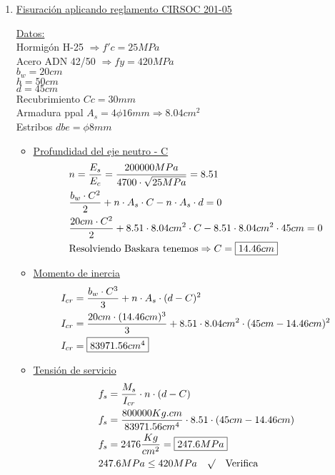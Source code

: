 \begin{enumerate}
\item \underline{Fisuración aplicando reglamento CIRSOC 201-05}

\underline{Datos:}\\
Hormigón H-25 $\Rightarrow f'c = 25 MPa$\\
Acero ADN 42/50 $\Rightarrow fy = 420 MPa$\\
$b_w = 20cm $\\
$h = 50cm $\\
$d= 45cm $\\
Recubrimiento $Cc = 30mm$\\
Armadura ppal $A_s = 4 \phi 16mm \Rightarrow 8.04 cm^2$\\
Estribos $dbe = \phi 8mm$\\

\begin{itemize}
\item \underline{Profundidad del eje neutro - C}
\begin{align*}
& n = \frac{E_s}{E_c} = \frac{200000 MPa}{4700 \cdot \sqrt{25MPa}} = 8.51 \\
& \frac{b_w \cdot C^2}{2} + n \cdot A_s \cdot C - n \cdot A_s \cdot d = 0 \\
& \frac{20cm \cdot C^2}{2} + 8.51 \cdot 8.04cm^2 \cdot C - 8.51 \cdot 8.04cm^2 \cdot 45cm = 0 \\
& \text{Resolviendo Baskara tenemos} \Rightarrow C=\framebox{$14.46cm$}
\end{align*}

\item \underline{Momento de inercia}
\begin{align*}
& I_{cr} = \frac{b_w \cdot C^3}{3} + n \cdot A_s \cdot (d - C)^2 \\
& I_{cr} = \frac{20cm \cdot (14.46cm)^3}{3} + 8.51 \cdot 8.04cm^2 \cdot (45cm - 14.46cm)^2 \\
& I_{cr} = \framebox{$83971.56cm^4$}
\end{align*}

\item \underline{Tensión de servicio}
\begin{align*}
& f_s = \frac{M_s}{I_{cr}} \cdot n \cdot (d - C) \\
& f_s = \frac{800000Kg.cm}{83971.56cm^4} \cdot 8.51 \cdot (45cm - 14.46cm) \\
& f_s = 2476 \frac{Kg}{cm^2} = \framebox{$247.6MPa$} \\
& 247.6MPa \leq 420MPa \quad \surd \quad \text{Verifica}
\end{align*}


\end{itemize}
\end{enumerate}
